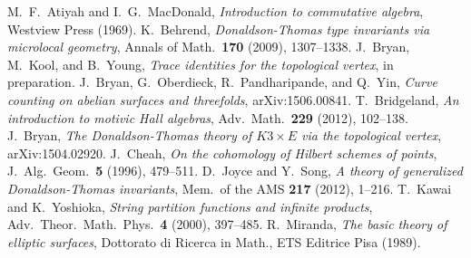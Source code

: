 \documentclass{amsart}
\theoremstyle{definition}
\begin{document}
     
\begin{thebibliography}{BOPY}
 M.~F.~Atiyah and I.~G.~MacDonald, \textit{Introduction to commutative algebra}, Westview Press (1969).
 K.~Behrend, \textit{Donaldson-Thomas type invariants via microlocal geometry}, Annals of Math.~\textbf{170} (2009), 1307--1338.
 J.~Bryan, M.~Kool, and B.~Young, \textit{Trace identities for the topological vertex}, in preparation.
 J.~Bryan, G.~Oberdieck, R.~Pandharipande, and Q.~Yin, \emph{Curve counting on abelian surfaces and threefolds}, arXiv:1506.00841.
 T.~Bridgeland, \textit{An introduction to motivic Hall algebras}, Adv.~Math.~\textbf{229} (2012), 102--138.
 J.~Bryan, \textit{The Donaldson-Thomas theory of $K3 \times E$ via the topological vertex}, arXiv:1504.02920.
 J.~Cheah, \textit{On the cohomology of Hilbert schemes of points}, J.~Alg.~Geom.~\textbf{5} (1996), 479--511.
 D.~Joyce and Y.~Song, \textit{A theory of generalized Donaldson-Thomas invariants}, Mem.~of the AMS \textbf{217} (2012), 1--216.
 T.~Kawai and K.~Yoshioka, \emph{String partition functions and infinite products}, Adv.~Theor.~Math.~Phys.~\textbf{4} (2000), 397--485.
 R.~Miranda, \textit{The basic theory of elliptic surfaces}, Dottorato di Ricerca in Math., ETS Editrice Pisa (1989).

\end{thebibliography}
\end{document}
